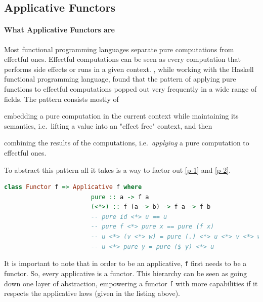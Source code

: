 \documentclass[
  oneside,
  11pt, a4paper,
  footinclude=true,
  headinclude=true,
  cleardoublepage=empty
]{scrbook}
\theoremstyle{definition}
\theoremstyle{definition}
\begin{document}
	    \subsection{Applicative Functors}
	    
	        \paragraph{What Applicative Functors are}
	        
    Most functional programming languages separate pure computations from effectful ones. Effectful computations can be seen as every computation that performs side effects or runs in a given context. \cite{mcbride2008applicative}, while working with the Haskell functional programming language, found that the pattern of applying pure functions to effectful computations popped out very frequently in a wide range of fields. The pattern consists mostly of
	    \begin{inparaenum}
            \item embedding a pure computation in the current context while maintaining its semantics, i.e.\ lifting a value into an "effect free" context,\label{p-1} and then
            \item combining the results of the computations, i.e.\ \emph{applying} a pure computation to effectful ones.\label{p-2}
        \end{inparaenum}
	To abstract this pattern all it takes is a way to factor out \ref{p-1} and \ref{p-2}.
	             
	            \begin{lstlisting}[language=Haskell, caption={Applicative laws},captionpos=b]
	                class Functor f => Applicative f where
	                    pure :: a -> f a
	                    (<*>) :: f (a -> b) -> f a -> f b
	                    -- pure id <*> u == u
	                    -- pure f <*> pure x == pure (f x)
	                    -- u <*> (v <*> w) = pure (.) <*> u <*> v <*> w
	                    -- u <*> pure y = pure ($ y) <*> u
	            \end{lstlisting}{}
	            
    It is important to note that in order to be an applicative, \texttt{f} first needs to be a functor. So, every applicative is a functor. This hierarchy can be seen as going down one layer of abstraction, empowering a functor \texttt{f} with more capabilities if it respects the applicative laws (given in the listing above).
	            
\end{document}
